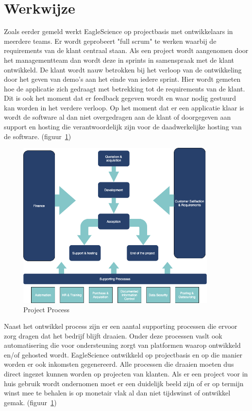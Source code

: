 \section{Werkwijze}\label{sec:werkwijze}
Zoals eerder gemeld werkt EagleScience op projectbasis met ontwikkelaars in meerdere teams. Er wordt geprobeert "full scrum" te werken waarbij de requirements van de klant centraal staan. Als een project wordt aangenomen door het managementteam dan wordt deze in sprints in samenspraak met de klant ontwikkeld. De klant wordt nauw betrokken bij het verloop van de ontwikkeling door het geven van demo's aan het einde van iedere sprint. Hier wordt gemeten hoe de applicatie zich gedraagt met betrekking tot de requirements van de klant. Dit is ook het moment dat er feedback gegeven wordt en waar nodig gestuurd kan worden in het verdere verloop. Op het moment dat er een applicatie klaar is wordt de software al dan niet overgedragen aan de klant of doorgegeven aan support en hosting die verantwoordelijk zijn voor de daadwerkelijke hosting van de software. (figuur~\ref{fig:Project Process})

\begin{figure}[bth]
\myfloatalign
\includegraphics[width=10cm]{gfx/ProcessFlow}
\caption{Project Process}
\label{fig:Project Process}
\end{figure}

Naast het ontwikkel process zijn er een aantal supporting processen die ervoor zorg dragen dat het bedrijf blijft draaien. Onder deze processen vaslt ook automatisering die voor ondersteuning zorgt van platformen waarop ontwikkeld en/of gehosted wordt.  EagleScience ontwikkeld op projectbasis en op die manier worden er ook inkomsten gegenereerd. Alle processen die draaien moeten dus direct ingezet kunnen worden op projecten van klanten. Als er een project voor in huis gebruik wordt ondernomen moet er een duidelijk beeld zijn of er op termijn winst mee te behalen is op monetair vlak al dan niet tijdswinst of ontwikkel gemak. (figuur~\ref{fig:Project Process})

